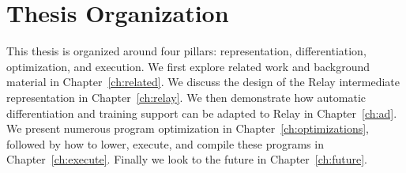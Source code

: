 \section{Thesis Organization}

This thesis is organized around four pillars: representation, differentiation, optimization, and execution.
We first explore related work and background material in Chapter~\ref{ch:related}.
We discuss the design of the Relay intermediate representation in Chapter~\ref{ch:relay}.
We then demonstrate how automatic differentiation and training support can be adapted to Relay in Chapter~\ref{ch:ad}.
We present numerous program optimization in Chapter~\ref{ch:optimizations},
  followed by how to lower, execute, and compile these programs in
  Chapter~\ref{ch:execute}.
Finally we look to the future in Chapter~\ref{ch:future}.

